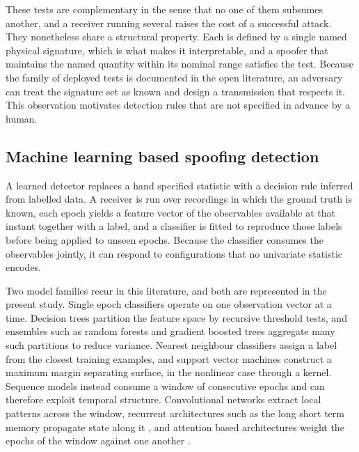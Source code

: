 These tests are complementary in the sense that no one of them subsumes another, and a
receiver running several raises the cost of a successful attack. They nonetheless share a
structural property. Each is defined by a single named physical signature, which is what
makes it interpretable, and a spoofer that maintains the named quantity within its nominal
range satisfies the test. Because the family of deployed tests is documented in the open
literature, an adversary can treat the signature set as known and design a transmission
that respects it. This observation motivates detection rules that are not specified in
advance by a human.

\subsection{Machine learning based spoofing detection}
\label{sec:rw_learning}

A learned detector replaces a hand specified statistic with a decision rule inferred from
labelled data. A receiver is run over recordings in which the ground truth is known, each
epoch yields a feature vector of the observables available at that instant together with a
label, and a classifier is fitted to reproduce those labels before being applied to unseen
epochs. Because the classifier consumes the observables jointly, it can respond to
configurations that no univariate statistic encodes.

Two model families recur in this literature, and both are represented in the present
study. Single epoch classifiers operate on one observation vector at a time. Decision
trees partition the feature space by recursive threshold tests, and ensembles such as
random forests and gradient boosted trees aggregate many such partitions to reduce
variance. Nearest neighbour classifiers assign a label from the closest training examples,
and support vector machines construct a maximum margin separating surface, in the
nonlinear case through a kernel. Sequence models instead consume a window of consecutive
epochs and can therefore exploit temporal structure. Convolutional networks extract local
patterns across the window, recurrent architectures such as the long short term memory
propagate state along it \citep{hochreiter1997long}, and attention based architectures
weight the epochs of the window against one another \citep{vaswani2017attention}.

